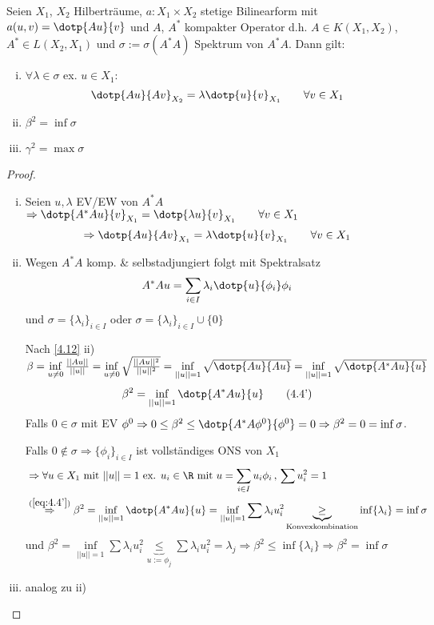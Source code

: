 \begin{satz} \label{4.13}
Seien $X_1$, $X_2$ Hilberträume, $a: X_1 \times X_2$ stetige Bilinearform mit $a(u,v) = \dotp{Au}{v}$ und $A$, $A^*$ kompakter Operator d.h. $A \in K(X_1,X_2)$, $A^* \in L(X_2,X_1)$ und $\sigma := \sigma(A^*A)$ Spektrum von $A^*A$. Dann gilt:
\begin{enumerate}[i)]
	\item $\forall \lambda \in \sigma$ ex. $u \in X_1$:
	\[
		\dotp{Au}{Av}_{X_2} = \lambda \dotp{u}{v}_{X_1} \qquad \forall v \in X_1
	\]
	\item $\beta^2 = \inf \sigma$
	\item $\gamma^2 = \max \sigma$
\end{enumerate}
\begin{proof}
\begin{enumerate}[i)]
\item Seien $u, \lambda$ EV/EW von $A^*A$ $\Rightarrow \dotp{A^*Au}{v}_{X_1} = \dotp{\lambda u}{v}_{X_1} \qquad \forall v \in X_1$
\[
	\Rightarrow \dotp{Au}{Av}_{X_1} = \lambda \dotp{u}{v}_{X_1} \qquad \forall v \in X_1
\]
\item Wegen $A^*A$ komp. \& selbstadjungiert folgt mit Spektralsatz
\[
	A^*Au = \sum\limits_{i \in I} \lambda_i \dotp{u}{\phi_i}\phi_i
\]
und $\sigma = \{\lambda_i\}_{i \in I}$ oder $\sigma = \{\lambda_i\}_{i \in I} \cup \{0\}$

Nach \ref{4.12} ii) $\beta = \inf\limits_{u \neq 0} \frac{||Au||}{||u||} = \inf\limits_{u \neq 0} \sqrt{\frac{||Au||^2}{||u||^2}} = \inf\limits_{||u|| = 1} \sqrt{\dotp{Au}{Au}} = \inf\limits_{||u||=1} \sqrt{\dotp{A^*Au}{u}}$
\begin{align} \label{eq:4.4'}
	\beta^2 = \inf\limits_{||u||=1} \dotp{A^*Au}{u} \tag{4.4'}
\end{align}
Falls $0 \in \sigma$ mit EV $\phi^0 \Rightarrow 0 \leq \beta^2 \leq \dotp{A^*A\phi^0}{\phi^0} = 0 \Rightarrow \beta^2 = 0 = \inf \sigma$.

Falls $0 \not\in \sigma \Rightarrow \{\phi_i\}_{i \in I}$ ist vollständiges ONS von $X_1$
\begin{align*}
	&\Rightarrow \forall u \in X_1 \text{ mit } ||u||=1 \text{ ex. } u_i \in \R \text{ mit } u = \sum\limits_{i \in I} u_i \phi_i \, , \, \sum u_i^2 = 1 \\
	&\overset{(\ref{eq:4.4'})}{\Rightarrow} \beta^2 = \inf\limits_{||u||=1} \dotp{A^*Au}{u} = \inf\limits_{||u||=1} \sum \lambda_i u_i^2  \underbrace{\geq}_{\text{Konvexkombination}} \inf \{\lambda_i\} = \inf \sigma
\end{align*}
und $\beta^2 = \inf\limits_{||u||=1} \sum \lambda_i u_i^2 \underbrace{\leq}_{u := \phi_j} \sum \lambda_i u_i^2 = \lambda_j \Rightarrow \beta^2 \leq \inf \{\lambda_i\} \Rightarrow \beta^2 = \inf \sigma$
\item analog zu ii)
\end{enumerate}
\end{proof}
\end{satz}

